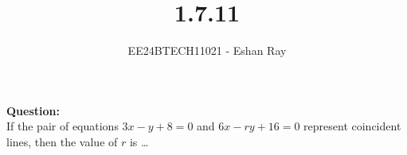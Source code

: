 \documentclass[journal]{IEEEtran}
\begin{document}

\vspace{3cm}

\title{1.7.11}
\author{EE24BTECH11021 - Eshan Ray}

{\let\newpage\relax\maketitle}

\renewcommand{\thefigure}{\theenumi}
\renewcommand{\thetable}{\theenumi}
\setlength{\intextsep}{10pt} %




\textbf{Question: }\\
If the pair of equations $3x - y + 8 = 0$ and $6x - ry+ 16 = 0$ represent coincident lines,
then the value of $r$ is \dots\\
\end{document}
